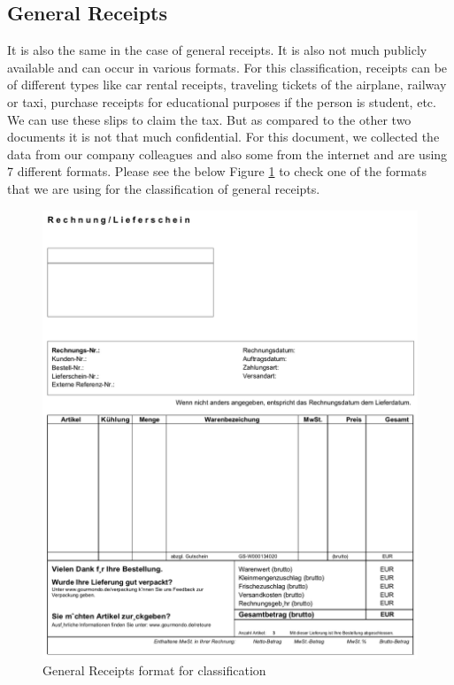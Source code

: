 \subsection{General Receipts}
It is also the same in the case of general receipts. It is also not much publicly available and can occur in various formats. For this classification, receipts can be of different types like car rental receipts, traveling tickets of the airplane, railway or taxi, purchase receipts for educational purposes if the person is student, etc. We can use these slips to claim the tax. But as compared to the other two documents it is not that much confidential. For this document, we collected the data from our company colleagues and also some from the internet and are using 7 different formats. Please see the below Figure \ref{gr_formats} to check one of the formats that we are using for the classification of general receipts. 
\begin{figure}[H]
\centering
\includegraphics[scale=0.6]{images/Chapter3/gs-format-1.png}
\caption{General Receipts format for classification}
\label{gr_formats}
\end{figure}
